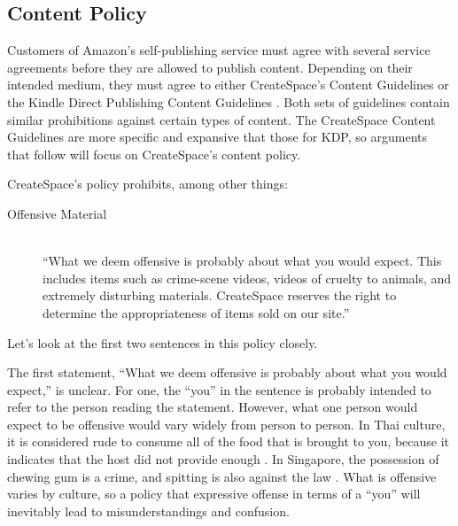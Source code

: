 \documentclass[11pt]{article}
\begin{document}
\begin{multicols}{2}
\subsection{Content Policy}

Customers of Amazon's self-publishing service must agree with several service agreements before they are allowed to publish content.  Depending on their intended medium, they must agree to either CreateSpace's Content Guidelines \cite{CreateSpaceContentGuidelines} or the Kindle Direct Publishing Content Guidelines \cite{AmazonKDPContentGuidelines}.  Both sets of guidelines contain similar prohibitions against certain types of content.  The CreateSpace Content Guidelines are more specific and expansive that those for KDP, so arguments that follow will focus on CreateSpace's content policy.

CreateSpace's policy prohibits, among other things:

\begin{description}
\item[Offensive Material] \hfill \\
      ``What we deem offensive is probably about what you would expect. This includes items such as crime-scene videos, videos of cruelty to animals, and extremely disturbing materials. CreateSpace reserves the right to determine the appropriateness of items sold on our site.'' \cite{CreateSpaceContentGuidelines}

\end{description}

Let's look at the first two sentences in this policy closely.

The first statement, ``What we deem offensive is probably about what you would expect,'' is unclear.  For one, the ``you'' in the sentence is probably intended to refer to the person reading the statement.  However, what one person would expect to be offensive would vary widely from person to person.  In Thai culture, it is considered rude to consume all of the food that is brought to you, because it indicates that the host did not provide enough \cite{EHowThai}.  In Singapore, the possession of chewing gum is a crime, and spitting is also against the law \cite{HotelTravelSingapore}.  What is offensive varies by culture, so a policy that expressive offense in terms of a ``you'' will inevitably lead to misunderstandings and confusion.


\end{multicols}
\end{document}
